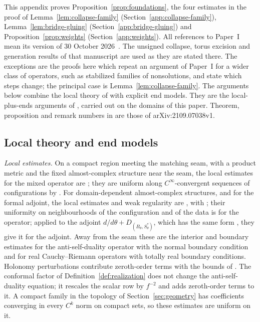 \documentclass[11pt]{amsart}
\theoremstyle{definition}
\theoremstyle{remark}
\theoremstyle{plain}
\numberwithin{equation}{section}
\begin{document}
This appendix proves Proposition~\ref{prop:foundations}, the four estimates in the proof of Lemma~\ref{lem:collapse-family} (Section~\ref{app:collapse-family}), Lemma~\ref{lem:bridge-gluing} (Section~\ref{app:bridge-gluing}) and Proposition~\ref{prop:weights} (Section~\ref{app:weights}). All
references to Paper~I mean its version of 30 October 2026~\cite{PaperI}. The unsigned collapse, torus excision and generation results of that
manuscript are used as they are stated there. The exceptions are the
proofs here which repeat an argument of Paper~I for a wider class of
operators, such as stabilized families of nonsolutions, and state which
steps change; the principal case is Lemma~\ref{lem:collapse-family}. The arguments below
combine the local theory of \cite{DFL,DFL-mixed} with explicit end
models. They are the local-plus-ends arguments of
\cite[Lemma~4.34]{DFL}, carried out on the domains of this paper.
Theorem, proposition and remark numbers in \cite{DFL-mixed} are those
of arXiv:2109.07038v1.

\subsection{Local theory and end models}\label{app:local}
\emph{Local estimates.} On a compact region meeting the matching seam,
with a product metric and the fixed almost-complex structure near the
seam, the local estimates for the mixed operator are
\cite[Theorem~4.17]{DFL}; they are uniform along $C^\infty$-convergent
sequences of configurations by \cite[Remark~4.19]{DFL}. For
domain-dependent almost-complex structures, and for the formal adjoint,
the local estimates and weak regularity are \cite[Theorem~5]{DFL-mixed},
with \cite[Remark~4.33]{DFL}; their uniformity on neighbourhoods of the
configuration and of the data is \cite[Remarks~5.73 and~5.76]{DFL-mixed}
for the operator; applied to the adjoint
$d/d\theta+D_{(B_\theta,S^*_\theta)}$, which has the same form
\cite[Section~5, before Theorem~5.9]{DFL-mixed}, they give it for the
adjoint. Away from the seam these are
the interior and boundary estimates for the anti-self-duality operator
with the normal boundary condition and for real Cauchy--Riemann
operators with totally real boundary conditions. Holonomy perturbations
contribute zeroth-order terms with the bounds of
\cite[Proposition~6.1]{DFL}. The conformal factor of
Definition~\ref{def:realization} does not change the anti-self-duality
equation; it rescales the scalar row by $f^{-2}$ and adds zeroth-order
terms to it. A compact
family in the topology of Section~\ref{sec:geometry} has coefficients
converging in every $C^k$ norm on compact sets, so these estimates are
uniform on it.
\end{document}
